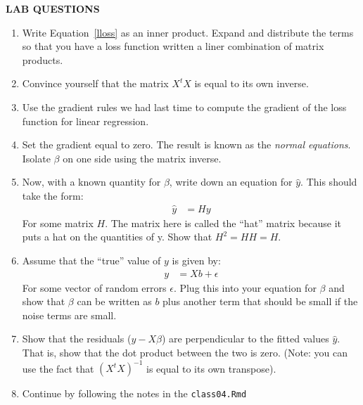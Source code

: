 \documentclass[12pt,hidelinks]{article}
\numberwithin{equation}{section}
\begin{document}
\newpage

\textbf{LAB QUESTIONS}

\vspace*{0pt}

\begin{enumerate}
\item Write Equation~\ref{lloss} as an inner product. Expand and distribute
the terms so that you have a loss function written a liner combination of
matrix products.
\item Convince yourself that the matrix $X^t X$ is equal to its own inverse.
\item Use the gradient rules we had last time to compute the gradient of the
loss function for linear regression.
\item Set the gradient equal to zero. The result is known as the
\textit{normal equations}. Isolate $\beta$ on one side using the matrix inverse.
\item Now, with a known quantity for $\beta$, write down an equation for $\widehat{y}$.
This should take the form:
\begin{align}
\widehat{y} &= H y
\end{align}
For some matrix $H$. The matrix here is called the ``hat'' matrix because it
puts a hat on the quantities of y. Show that $H^2 = HH = H$.
\item Assume that the ``true'' value of $y$ is given by:
\begin{align}
y &= X b + \epsilon
\end{align}
For some vector of random errors $\epsilon$. Plug this into your equation for
$\beta$ and show that $\beta$ can be written as $b$ plus another term that should
be small if the noise terms are small.
\item Show that the residuals ($y - X\beta$) are perpendicular to the fitted
values $\widehat{y}$. That is, show that the dot product between the two is
zero. (Note: you can use the fact that $(X^tX)^{-1}$ is equal to its own transpose).
\item Continue by following the notes in the \texttt{class04.Rmd}
\end{enumerate}
\end{document}
